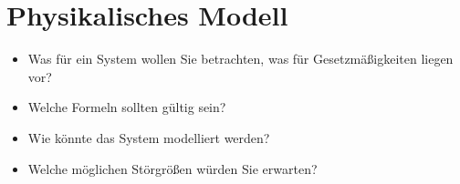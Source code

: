 \section{Physikalisches Modell}
\label{sec:Physikalisches Modell}

\begin{itemize}
    \item Was für ein System wollen Sie betrachten, was für Gesetzmäßigkeiten liegen vor?
    \item Welche Formeln sollten gültig sein?
    \item Wie könnte das System modelliert werden?
    \item Welche möglichen Störgrößen würden Sie erwarten?
\end{itemize}


